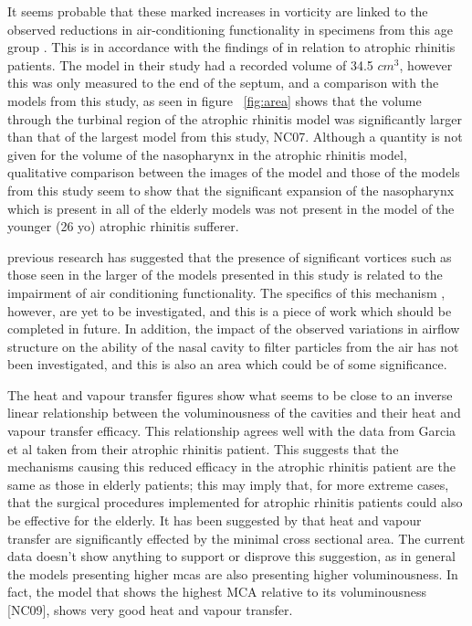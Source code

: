 It seems probable that these marked increases in vorticity are linked to the observed reductions in air-conditioning functionality in specimens from this age group \cite{Lindemann2009a}. This is in accordance with the findings of \cite{Garcia2007} in relation to atrophic rhinitis patients. The model in their study had a recorded volume of 34.5 $cm^3$, however this was only measured to the end of the septum, and a comparison with the models from this study, as seen in figure ~\ref{fig:area} shows that the volume through the turbinal region of the atrophic rhinitis model was significantly larger than that of the largest model from this study, NC07. Although a quantity is not given for the volume of the nasopharynx in the atrophic rhinitis model, qualitative comparison between the  images of the model and those of the models from this study seem to show that the significant expansion of the nasopharynx which is present in all of the elderly models was not present in the model of the younger (26 yo) atrophic rhinitis sufferer. 

previous research has suggested that the presence of significant vortices such as those seen in the larger of the models presented in this study is related to the impairment of air conditioning functionality. The specifics of this mechanism , however, are yet to be investigated, and this is a piece of work which should be completed in future. In addition, the impact of the observed variations in airflow structure on the ability of the nasal cavity to filter particles from the air has not been investigated, and this is also an area which could be of some significance.

The heat and vapour transfer figures show what seems to be close to an inverse linear relationship between the voluminousness of the cavities and their heat and vapour transfer efficacy. This relationship agrees well with the data from Garcia et al \cite{Garcia2007} taken from their atrophic rhinitis patient. This suggests that the mechanisms causing this reduced efficacy in the atrophic rhinitis patient are the same as those in elderly patients; this may imply that, for more extreme cases, that the surgical procedures implemented for atrophic rhinitis patients could also be effective for the elderly. It has been suggested by \cite{Lindemann2008} that heat and vapour transfer are significantly effected by the minimal cross sectional area. The current data doesn't show anything to support or disprove this suggestion, as in general the models presenting higher mcas are also presenting higher voluminousness. In fact, the model that shows the highest MCA relative to its voluminousness [NC09], shows very good heat and vapour transfer.
